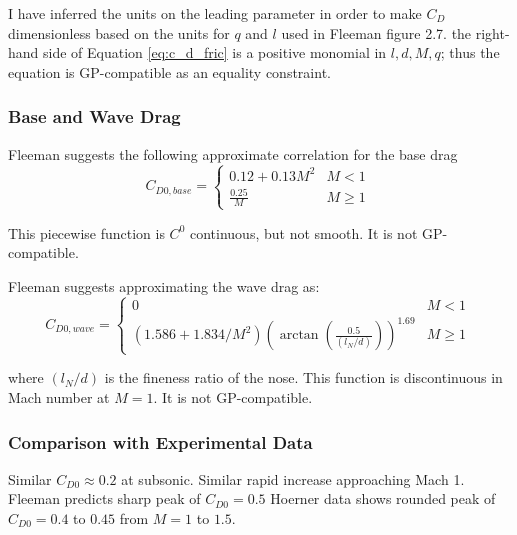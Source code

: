 \documentclass[12pt]{article}
\begin{document}
I have inferred the units on the leading parameter in order to make $C_{D}$ dimensionless based on the units for $q$ and $l$ used in Fleeman figure 2.7. the right-hand side of Equation \ref{eq:c_d_fric} is a positive monomial in $l, d, M, q$; thus the equation is GP-compatible as an equality constraint.


\subsubsection{Base and Wave Drag}
Fleeman suggests the following approximate correlation for the base drag
\begin{equation}
C_{D0, base} = 
  \begin{cases}
    0.12 + 0.13 M^2 & M < 1 \\
    \frac{0.25}{M} & M \geq 1 \
  \end{cases}
\end{equation}

This piecewise function is $C^0$ continuous, but not smooth. It is not GP-compatible.

Fleeman suggests approximating the wave drag as:
\begin{equation}
C_{D0, wave} = 
  \begin{cases}
    0 & M < 1 \\
    (1.586 + 1.834/M^2) \left( \arctan(\frac{0.5}{(l_N/d)})\right)^{1.69} & M \geq 1 \
  \end{cases}
\end{equation}

where $(l_N/d)$ is the fineness ratio of the nose. This function is discontinuous in Mach number at $M = 1$. It is not GP-compatible.

\subsubsection{Comparison with Experimental Data}

Similar $C_{D0} \approx 0.2$ at subsonic.
Similar rapid increase approaching Mach 1.
Fleeman predicts sharp peak of $C_{D0} = 0.5$
Hoerner data shows rounded peak of $C_{D0} = 0.4$ to $0.45$ from $M = 1$ to $1.5$.
\end{document}
